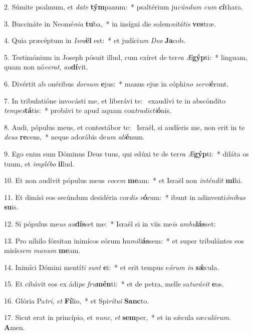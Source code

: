 2. Súmite psalmum, et \textit{da}\textit{te} \textbf{tým}panum:~*  psaltérium ju\textit{cún}\textit{dum} \textit{cum} \textbf{cí}thara.\

3. Buccináte in Neomé\textit{ni}\textit{a} \textbf{tu}ba,~*  in insígni die solem\textit{ni}\textit{tá}\textit{tis} \textbf{ves}træ.\

4. Quia præcéptum in \textit{Is}\textit{ra}\textbf{ël} est:~*  et judíci\textit{um} \textit{De}\textit{o} \textbf{Ja}cob.\

5. Testimónium in Joseph pósuit illud, cum exíret de ter\textit{ra} \textit{Æ}\textbf{gýp}ti:~*  linguam, quam non nó\textit{ve}\textit{rat}, \textit{au}\textbf{dí}vit.\

6. Divértit ab onéribus \textit{dor}\textit{sum} \textbf{e}jus:~*  manus ejus in cóphi\textit{no} \textit{ser}\textit{vi}\textbf{é}runt.\

7. In tribulatióne invocásti me, et liberávi te: \dag\  exaudívi te in abscóndito \textit{tem}\textit{pes}\textbf{tá}tis:~*  probávi te apud aquam con\textit{tra}\textit{dic}\textit{ti}\textbf{ó}nis.\

8. Audi, pópulus meus, et contestábor te: \dag\  Israël, si audíeris me, non erit in te \textit{de}\textit{us} \textbf{re}cens,~*  neque adorábis de\textit{um} \textit{a}\textit{li}\textbf{é}num.\

9. Ego enim sum Dóminus Deus tuus, qui edúxi te de ter\textit{ra} \textit{Æ}\textbf{gýp}ti:~*  diláta os tuum, et \textit{im}\textit{plé}\textit{bo} \textbf{il}lud.\

10. Et non audívit pópulus meus \textit{vo}\textit{cem} \textbf{me}am:~*  et Israël non \textit{in}\textit{tén}\textit{dit} \textbf{mi}hi.\

11. Et dimísi eos secúndum desidéria cor\textit{dis} \textit{e}\textbf{ó}rum:~*  ibunt in adinventi\textit{ó}\textit{ni}\textit{bus} \textbf{su}is.\

12. Si pópulus me\textit{us} \textit{au}\textbf{dís}set me:~*  Israël si in viis me\textit{is} \textit{am}\textit{bu}\textbf{lás}set:\

13. Pro níhilo fórsitan inimícos eórum hu\textit{mi}\textit{li}\textbf{ás}sem:~*  et super tribulántes eos misís\textit{sem} \textit{ma}\textit{num} \textbf{me}am.\

14. Inimíci Dómini mentí\textit{ti} \textit{sunt} \textbf{e}i:~*  et erit tempus e\textit{ó}\textit{rum} \textit{in} \textbf{sǽ}cula.\

15. Et cibávit eos ex ádi\textit{pe} \textit{fru}\textbf{mén}ti:~*  et de petra, melle sa\textit{tu}\textit{rá}\textit{vit} \textbf{e}os.\

16. Glória Pa\textit{tri}, \textit{et} \textbf{Fí}lio,~*  et Spi\textit{rí}\textit{tu}\textit{i} \textbf{Sanc}to.\

17. Sicut erat in princípio, et \textit{nunc}, \textit{et} \textbf{sem}per,~*  et in sǽcula sæ\textit{cu}\textit{ló}\textit{rum}. \textbf{A}men.\

